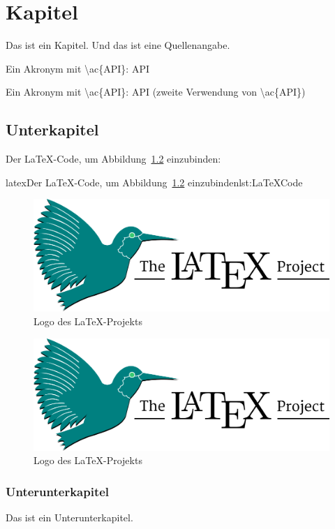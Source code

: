 

\chapter{Kapitel}
Das ist ein Kapitel.
Und das ist eine Quellenangabe\cite{MadeInGermanyLabel}.

Ein Akronym mit \textbackslash ac\{API\}: \ac{API}

Ein Akronym mit \textbackslash ac\{API\}: \ac{API} (zweite Verwendung von \textbackslash ac\{API\})


\section{Unterkapitel}
Der \LaTeX-Code, um Abbildung~\ref{fig:LaTeXProjectLogo} einzubinden:

\begin{code}{latex}{Der \LaTeX-Code, um Abbildung~\ref{fig:LaTeXProjectLogo} einzubinden}{lst:LaTeXCode}
    \begin{figure}[ht]
        \centering
        \includegraphics[width=0.5\linewidth]{images/LaTeX_project_logo_bird}
        \caption{Logo des \LaTeX-Projekts}
        \label{fig:LaTeXProjectLogo}
    \end{figure}
\end{code}
\definecolor{LinkColor}{HTML}{\linkColor}  %


\begin{figure}[ht]
    \centering
    \includegraphics[width=0.5\linewidth]{images/LaTeX_project_logo_bird}
    \caption{Logo des \LaTeX-Projekts}
    \label{fig:LaTeXProjectLogo}
\end{figure}

\subsection{Unterunterkapitel}
Das ist ein Unterunterkapitel.
